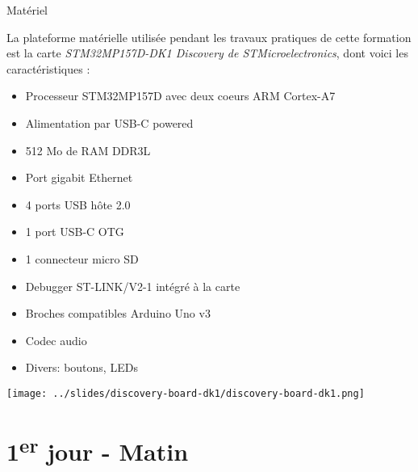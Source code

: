 \documentclass[a4paper,12pt,obeyspaces,spaces,hyphens]{article}
\begin{document}
\feagendatwocolumn
{Matériel}
{
  La plateforme matérielle utilisée pendant les travaux pratiques de
  cette formation est la carte {\em STM32MP157D-DK1 Discovery de
    STMicroelectronics}, dont voici les caractéristiques :

  \begin{itemize}
  \item Processeur STM32MP157D avec deux coeurs ARM Cortex-A7
  \item Alimentation par USB-C powered
  \item 512 Mo de RAM DDR3L
  \item Port gigabit Ethernet
  \item 4 ports USB hôte 2.0
  \item 1 port USB-C OTG
  \item 1 connecteur micro SD
  \item Debugger ST-LINK/V2-1 intégré à la carte
  \item Broches compatibles Arduino Uno v3
  \item Codec audio
  \item Divers: boutons, LEDs
  \end{itemize}
}
{}
{
  \begin{center}
    \texttt{[image: ../slides/discovery-board-dk1/discovery-board-dk1.png]}
  \end{center}
}

\section{1\textsuperscript{er} jour - Matin}
\end{document}
